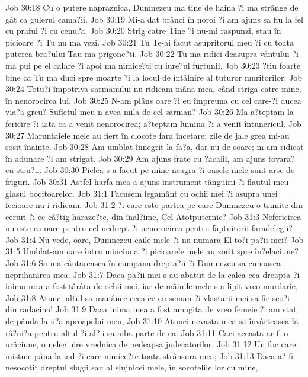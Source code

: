 Job 30:18  Cu o putere napraznica, Dumnezeu ma tine de haina ?i ma strânge de gât ca gulerul cama?ii.
Job 30:19  Mi-a dat brânci în noroi ?i am ajuns sa fiu la fel cu praful ?i cu cenu?a.
Job 30:20  Strig catre Tine ?i nu-mi raspunzi, stau în picioare ?i Tu nu ma vezi.
Job 30:21  Tu Te-ai facut asupritorul meu ?i cu toata puterea bra?ului Tau ma prigone?ti.
Job 30:22  Tu ma ridici deasupra vântului ?i ma pui pe el calare ?i apoi ma nimice?ti cu iure?ul furtunii.
Job 30:23  ?tiu foarte bine ca Tu ma duci spre moarte ?i la locul de întâlnire al tuturor muritorilor.
Job 30:24  Totu?i împotriva sarmanului nu ridicam mâna mea, când striga catre mine, în nenorocirea lui.
Job 30:25  N-am plâns oare ?i eu împreuna cu cel care-?i ducea via?a greu? Sufletul meu n-avea mila de cel sarman?
Job 30:26  Ma a?teptam la fericire ?i iata ca a venit nenorocirea; a?teptam lumina ?i a venit întunericul.
Job 30:27  Maruntaiele mele au fiert în clocote fara încetare; zile de jale grea mi-au sosit înainte.
Job 30:28  Am umblat înnegrit la fa?a, dar nu de soare; m-am ridicat în adunare ?i am strigat.
Job 30:29  Am ajuns frate cu ?acalii, am ajuns tovara? cu stru?ii.
Job 30:30  Pielea s-a facut pe mine neagra ?i oasele mele sunt arse de friguri.
Job 30:31  Astfel harfa mea a ajuns instrument tânguirii ?i flautul meu glasul bocitoarelor.
Job 31:1  Facusem legamânt cu ochii mei ?i asupra unei fecioare nu-i ridicam.
Job 31:2  ?i care este partea pe care Dumnezeu o trimite din ceruri ?i ce câ?tig haraze?te, din înal?ime, Cel Atotputernic?
Job 31:3  Nefericirea nu este ea oare pentru cel nedrept ?i nenorocirea pentru faptuitorii faradelegii?
Job 31:4  Nu vede, oare, Dumnezeu caile mele ?i nu numara El to?i pa?ii mei?
Job 31:5  Umblat-am oare întru minciuna ?i picioarele mele au zorit spre în?elaciune?
Job 31:6  Sa ma cântareasca în cumpana drepta?ii ?i Dumnezeu sa cunoasca neprihanirea mea.
Job 31:7  Daca pa?ii mei s-au abatut de la calea cea dreapta ?i inima mea a fost târâta de ochii mei, iar de mâinile mele s-a lipit vreo murdarie,
Job 31:8  Atunci altul sa manânce ceea ce eu seman ?i vlastarii mei sa fie sco?i din radacina!
Job 31:9  Daca inima mea a fost amagita de vreo femeie ?i am stat de pânda la u?a aproapelui meu,
Job 31:10  Atunci nevasta mea sa învârteasca la râ?ni?a pentru altul ?i al?ii sa aiba parte de ea.
Job 31:11  Caci aceasta ar fi o urâciune, o nelegiuire vrednica de pedeapsa judecatorilor,
Job 31:12  Un foc care mistuie pâna la iad ?i care nimice?te toata strânsura mea;
Job 31:13  Daca a? fi nesocotit dreptul slugii sau al slujnicei mele, în socotelile lor cu mine,
